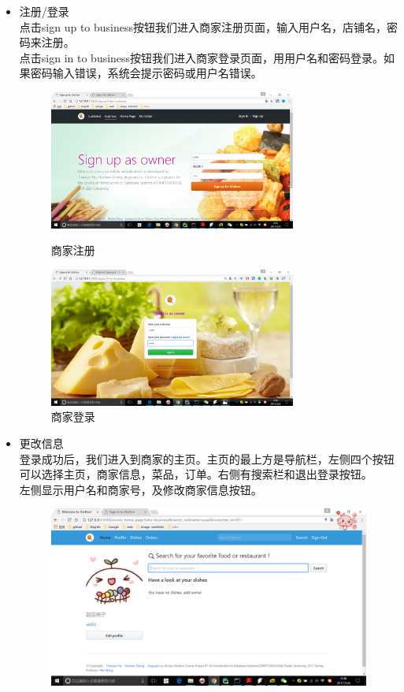 \documentclass[12pt, oneside,a4paper]{article}
\begin{document}
  \begin{itemize}
  \item 注册/登录\\
  点击sign up to business按钮我们进入商家注册页面，输入用户名，店铺名，密码来注册。\\
  点击sign in to business按钮我们进入商家登录页面，用用户名和密码登录。如果密码输入错误，系统会提示密码或用户名错误。
  \begin{figure}[H]
   \begin{minipage}[t]{0.5\linewidth}
    \centering
     \includegraphics[width=3.2in]{re-signup.jpg}
     \caption{\small{商家注册}}
   \end{minipage}
   \begin{minipage}[t]{0.5\linewidth}
    \centering
     \includegraphics[width=3.2in]{re-signin.jpg}
      \caption{\small{商家登录}}
   \end{minipage}
   \end{figure}
  \item 更改信息\\
  登录成功后，我们进入到商家的主页。主页的最上方是导航栏，左侧四个按钮可以选择主页，商家信息，菜品，订单。右侧有搜索栏和退出登录按钮。\\
  左侧显示用户名和商家号，及修改商家信息按钮。
  \begin{figure}[H]
   \centering
     \includegraphics[width=6.00in]{re-home.jpg}

\end{figure}
\end{itemize}
\end{document}

